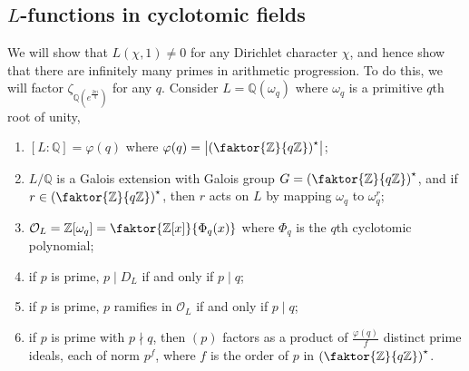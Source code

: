 \subsection{\texorpdfstring{\( L \)}{L}-functions in cyclotomic fields}
We will show that \( L(\chi, 1) \neq 0 \) for any Dirichlet character \( \chi \), and hence show that there are infinitely many primes in arithmetic progression.
To do this, we will factor \( \zeta_{\mathbb Q(e^{\frac{2\pi i}{q}})} \) for any \( q \).
Consider \( L = \mathbb Q(\omega_q) \) where \( \omega_q \) is a primitive \( q \)th root of unity,
\begin{proposition}
    \begin{enumerate}
        \item \( [L:\mathbb Q] = \varphi(q) \) where \( \varphi(q) = \abs{\qty(\faktor{\mathbb Z}{q\mathbb Z})^\star} \);
        \item \( L/\mathbb Q \) is a Galois extension with Galois group \( G = \qty(\faktor{\mathbb Z}{q\mathbb Z})^\star \), and if \( r \in \qty(\faktor{\mathbb Z}{q\mathbb Z})^\star \), then \( r \) acts on \( L \) by mapping \( \omega_q \) to \( \omega_q^r \);
        \item \( \mathcal O_L = \mathbb Z[\omega_q] = \faktor{\mathbb Z[x]}{\Phi_q(x)} \) where \( \Phi_q \) is the \( q \)th cyclotomic polynomial;
        \item if \( p \) is prime, \( p \mid D_L \) if and only if \( p \mid q \);
        \item if \( p \) is prime, \( p \) ramifies in \( \mathcal O_L \) if and only if \( p \mid q \);
        \item if \( p \) is prime with \( p \nmid q \), then \( (p) \) factors as a product of \( \frac{\varphi(q)}{f} \) distinct prime ideals, each of norm \( p^f \), where \( f \) is the order of \( p \) in \( \qty(\faktor{\mathbb Z}{q\mathbb Z})^\star \).
    \end{enumerate}
\end{proposition}
